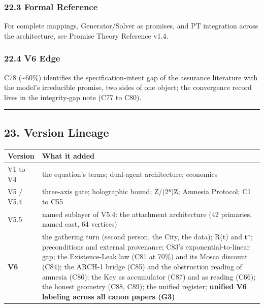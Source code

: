 \documentclass[
]{article}
\newcounter{none} %
\begin{document}
\subsubsection{22.3 Formal Reference}\label{formal-reference}

For complete mappings, Generator/Solver as promises, and PT integration
across the architecture, see Promise Theory Reference v1.4.

\subsubsection{22.4 V6 Edge}\label{v6-edge}

C78 (\textasciitilde60\%) identifies the specification-intent gap of the
assurance literature with the model's irreducible promise, two sides of
one object; the convergence record lives in the integrity-gap note (C77
to C80).

\begin{center}\rule{0.5\linewidth}{0.5pt}\end{center}

\subsection{23. Version Lineage}\label{version-lineage}

{\def\LTcaptype{none} %
\begin{longtable}[]{@{}
  >{\raggedright\arraybackslash}p{}
  >{\raggedright\arraybackslash}p{}@{}}
\toprule\noalign{}
\begin{minipage}[b]{\linewidth}\raggedright
Version
\end{minipage} & \begin{minipage}[b]{\linewidth}\raggedright
What it added
\end{minipage} \\
\midrule\noalign{}
\endhead
\bottomrule\noalign{}
\endlastfoot
V1 to V4 & the equation's terms; dual-agent architecture; economics \\
V5 / V5.4 & three-axis gate; holographic bound; Z/(2⁶)Z; Amnesia
Protocol; C1 to C55 \\
V5.5 & named sublayer of V5.4: the attachment architecture (42
primaries, named cast, 64 vertices) \\
\textbf{V6} & the gathering turn (second person, the City, the data);
R(t) and t*; preconditions and external provenance; C83's
exponential-to-linear gap; the Existence-Leak law (C81 at 70\%) and its
Mosca discount (C84); the ARCH-1 bridge (C85) and the obstruction
reading of amnesia (C86); the Key as accumulator (C87) and as reading
(C66); the honest geometry (C88, C89); the unified register;
\textbf{unified V6 labeling across all canon papers (G3)} \\
\end{longtable}
}
\end{document}
